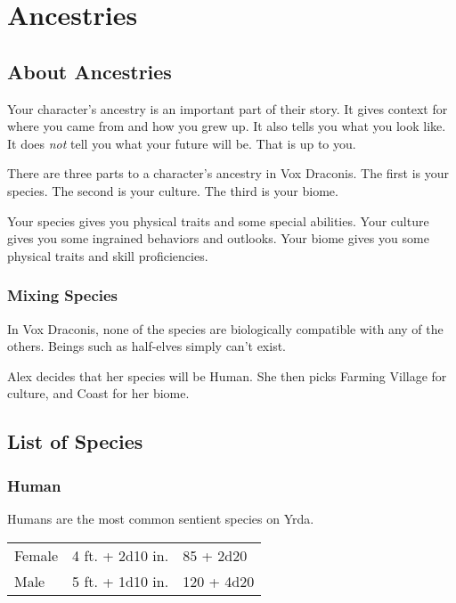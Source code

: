 \chapter{Ancestries}

\begin{multicols}{2}

\section{About Ancestries}

Your character's ancestry is an important part of their story. It gives
context for where you came from and how you grew up. It also tells you
what you look like. It does \textit{not} tell you what your future will
be. That is up to you.

There are three parts to a character's ancestry in Vox Draconis. The first
is your species. The second is your culture. The third is your biome.

Your species gives you physical traits and some special abilities. Your
culture gives you some ingrained behaviors and outlooks. Your biome gives
you some physical traits and skill proficiencies.

\subsection{Mixing Species}

In Vox Draconis, none of the species are biologically compatible with any of
the others. Beings such as half-elves simply can't exist.

\begin{displayquote}
Alex decides that her species will be Human. She then picks Farming Village
for culture, and Coast for her biome.
\end{displayquote}

\section{List of Species}

\subsection{Human}

Humans are the most common sentient species on Yrda.

\begin{center}
{
\begin{xtabular}{|l|l|l|}
Female & 4 ft. + 2d10 in. & 85 + 2d20 \\
Male & 5 ft. + 1d10 in. & 120 + 4d20 \\
\hline
\end{xtabular}
}
\end{center}


\end{multicols}
